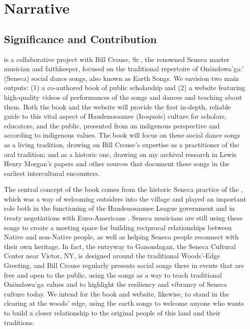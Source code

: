\documentclass{neh}
\begin{document}
\section{Narrative}
\subsection{Significance and Contribution}

 is a
collaborative project with Bill Crouse, Sr., the renowned Seneca master
musician and faithkeeper, focused on the traditional repertoire of
Onöndowa'ga:' (Seneca) social dance songs, also known as Earth Songs.
We envision two main outputs: (1) a co-authored book of public scholarship and
(2) a website featuring high-quality videos of performances of the songs and
dances and teaching about them.
Both the book and the website will provide the first in-depth, reliable
guide to this vital aspect of Haudenosaunee (Iroquois) culture for scholars,
educators, and the public, presented from an indigenous perspective and
according to indigenous values.  
The book will focus on these social dance songs as a living tradition, drawing
on Bill Crouse’s expertise as a practitioner of the oral tradition; and as a
historic one, drawing on my archival research in Lewis Henry Morgan’s papers
and other sources that document these songs in the earliest intercultural
encounters. 

The central concept of the book comes from the historic Seneca practice of the
, which was a way of welcoming outsiders into the
village and played an important role both in the functioning of the
Haudenosaunee League government and in treaty negotiations with
Euro-Americans
\Autocite{Richter:Ordeal}.
Seneca musicians are still using these songs to create a meeting space for
building reciprocal relationships between Native and non-Native people, as
well as helping Seneca people reconnect with their own heritage.
In fact, the entryway to Ganondagan, the Seneca Cultural Center near Victor,
NY, is designed around the traditional Woods'-Edge Greeting, and Bill Crouse
regularly presents social songs there in events that are free and open to the
public, using the songs as a way to teach traditional Onöndowa'ga values and
to highlight the resiliency and vibrancy of Seneca culture today.
We intend for the book and website, likewise, to stand in the clearing at the
woods' edge, using the earth songs to welcome anyone who wants to build a
closer relationship to the original people of this land and their traditions.
\end{document}
